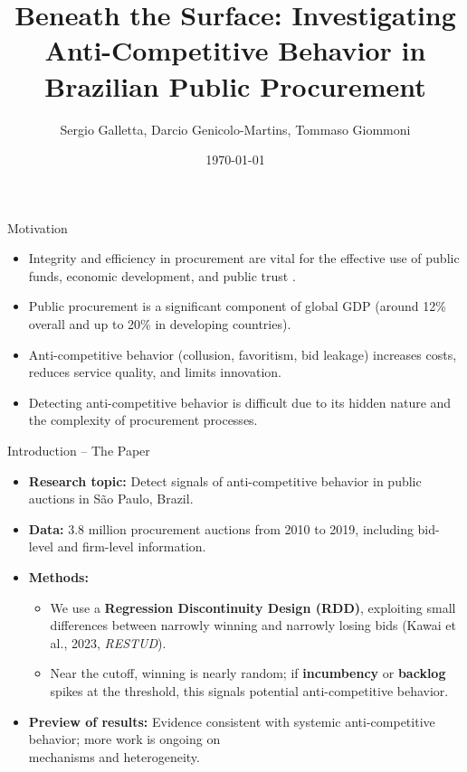 \documentclass{beamer}
\title[Beneath the Surface - LACEA]{\textbf{Beneath the Surface: Investigating Anti-Competitive Behavior in Brazilian Public Procurement}}
\author[Galletta, Genicolo-Martins, Giommoni]{Sergio Galletta, Darcio Genicolo-Martins, Tommaso Giommoni}
\institute[]{ETH Zürich \and Insper \and University of Amsterdam}
\date{\today}
\begin{document}
\begin{frame}
  \titlepage
\end{frame}


\begin{frame}{Motivation}
  \begin{itemize}
    \item Integrity and efficiency in procurement are vital for the effective use of public funds, economic development, and public trust \cite{BosioEtAl2022}.
    \item Public procurement is a significant component of global GDP (around 12\% overall and up to 20\% in developing countries).
    \item Anti-competitive behavior (collusion, favoritism, bid leakage) increases costs, reduces service quality, and limits innovation.
    \item Detecting anti-competitive behavior is difficult due to its hidden nature and the complexity of procurement processes.
  \end{itemize}
\end{frame}

\begin{frame}{Introduction -- The Paper}
\begin{itemize}
  \item \textbf{Research topic:} Detect signals of anti-competitive behavior in public auctions in S\~{a}o Paulo, Brazil. \pause
  \item \textbf{Data:} 3.8 million procurement auctions from 2010 to 2019, including bid-level and firm-level information. \pause
  \item \textbf{Methods:}
    \begin{itemize}
      \item We use a \textbf{Regression Discontinuity Design (RDD)}, exploiting small differences between narrowly winning and narrowly losing bids (Kawai et al., 2023, \emph{RESTUD}).
      \item Near the cutoff, winning is nearly random; if \textbf{incumbency} or \textbf{backlog} spikes at the threshold, this signals potential anti-competitive behavior.
    \end{itemize} \pause
  \item \textbf{Preview of results:} Evidence consistent with systemic anti-competitive behavior; more work is ongoing on \\ mechanisms and heterogeneity.
\end{itemize}
\end{frame}
\end{document}
